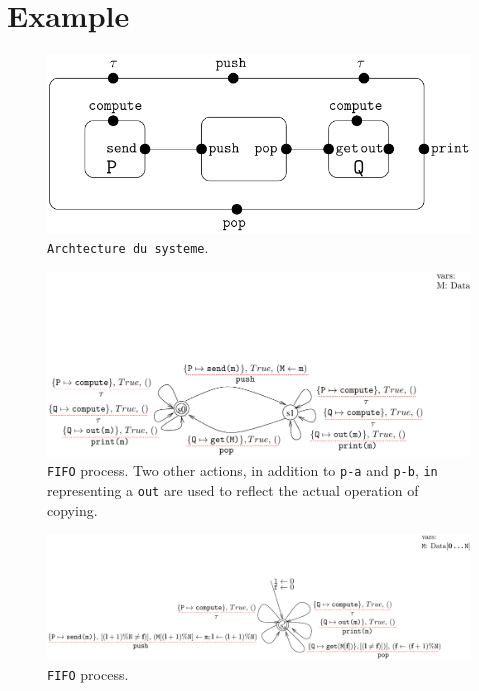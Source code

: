 \documentclass[runningheads]{llncs}
\begin{document}
\section{Example}



\begin{figure}[!tb]
 \centering
   \includegraphics[width=.65\textwidth]{Figures/Architecture.pdf}
   \caption{\texttt{Archtecture du systeme}. \label{Fig:Archi}}
\end{figure}

\begin{figure}[!tb]
 \centering
   \includegraphics[width=.90\textwidth]{Figures/FIFOpen2.pdf}
   \caption{\texttt{FIFO} process.  Two other actions,  in addition to  \texttt{p-a} and \texttt{p-b},  \texttt{in} representing a     \texttt{out} are used to reflect the actual operation of copying. \label{Fig:FIFOA}}
\end{figure}





\begin{figure}[!tb]
 \centering
   \includegraphics[width=1.25\textwidth]{Figures/FIFORing.pdf}
   \caption{\texttt{FIFO} process.  \label{Fig:RefineOA}}
\end{figure}
\end{document}
